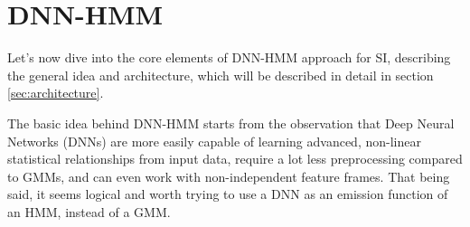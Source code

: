 \section{DNN-HMM}\label{sec:dnnhmm}
Let's now dive into the core elements of DNN-HMM approach for SI, describing the general idea and architecture, which will be described in detail in section \vref{sec:architecture}.

The basic idea behind DNN-HMM starts from the observation that Deep Neural Networks (DNNs) are more easily capable of learning advanced, non-linear statistical relationships from input data, require a lot less preprocessing compared to GMMs, and can even work with non-independent feature frames. That being said, it seems logical and worth trying to use a DNN as an emission function of an HMM, instead of a GMM.







